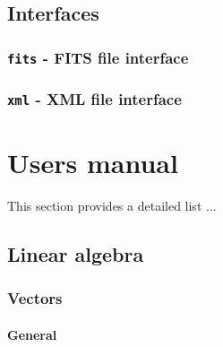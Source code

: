 \documentclass{article}[12pt,a4]
\begin{document}
\subsection{Interfaces}

\subsubsection{{\tt fits} - FITS file interface}
\label{sec:fits}


\subsubsection{{\tt xml} - XML file interface}
\label{sec:xml}



%
\clearpage
\section{Users manual}

This section provides a detailed list ...

\subsection{Linear algebra}

\subsubsection{Vectors}

\paragraph{General}
\end{document}
